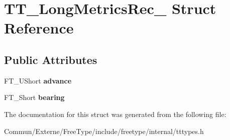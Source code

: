 \hypertarget{struct_t_t___long_metrics_rec__}{}\section{T\+T\+\_\+\+Long\+Metrics\+Rec\+\_\+ Struct Reference}
\label{struct_t_t___long_metrics_rec__}
\subsection*{Public Attributes}
\begin{DoxyCompactItemize}
\item 
F\+T\+\_\+\+U\+Short {\bfseries advance}\hypertarget{struct_t_t___long_metrics_rec___a47100e42b52486bc374f80ed2795361d}{}\label{struct_t_t___long_metrics_rec___a47100e42b52486bc374f80ed2795361d}

\item 
F\+T\+\_\+\+Short {\bfseries bearing}\hypertarget{struct_t_t___long_metrics_rec___a0d74e3eb8611b0a5e89e338af35be4da}{}\label{struct_t_t___long_metrics_rec___a0d74e3eb8611b0a5e89e338af35be4da}

\end{DoxyCompactItemize}


The documentation for this struct was generated from the following file\+:\begin{DoxyCompactItemize}
\item 
Commun/\+Externe/\+Free\+Type/include/freetype/internal/tttypes.\+h\end{DoxyCompactItemize}
